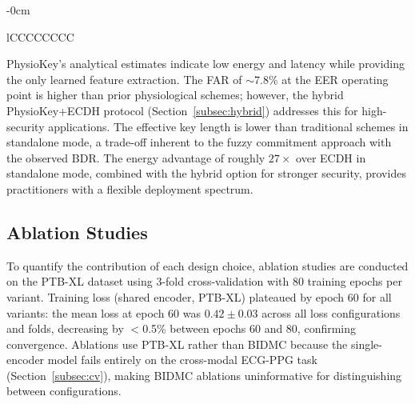\documentclass[sensors,article,submit,pdftex,moreauthors]{Definitions/mdpi}
\begin{document}
\begin{table}[H]
\begin{adjustwidth}{-\extralength}{0cm}
\begin{tabularx}{\fulllength}{lCCCCCCCC}
\bottomrule
\end{tabularx}
\end{adjustwidth}
\end{table}

PhysioKey's analytical estimates indicate low energy and latency while providing the only learned feature extraction. The FAR of ${\sim}$7.8\% at the EER operating point is higher than prior physiological schemes; however, the hybrid PhysioKey+ECDH protocol (Section~\ref{subsec:hybrid}) addresses this for high-security applications. The effective key length is lower than traditional schemes in standalone mode, a trade-off inherent to the fuzzy commitment approach with the observed BDR. The energy advantage of roughly $27\times$ over ECDH in standalone mode, combined with the hybrid option for stronger security, provides practitioners with a flexible deployment spectrum.


\subsection{Ablation Studies}
\label{subsec:ablation}

To quantify the contribution of each design choice, ablation studies are conducted on the PTB-XL dataset using 3-fold cross-validation with 80 training epochs per variant. Training loss (shared encoder, PTB-XL) plateaued by epoch 60 for all variants: the mean loss at epoch 60 was $0.42 \pm 0.03$ across all loss configurations and folds, decreasing by $<$0.5\% between epochs 60 and 80, confirming convergence. Ablations use PTB-XL rather than BIDMC because the single-encoder model fails entirely on the cross-modal ECG-PPG task (Section~\ref{subsec:cv}), making BIDMC ablations uninformative for distinguishing between configurations.
\end{document}
